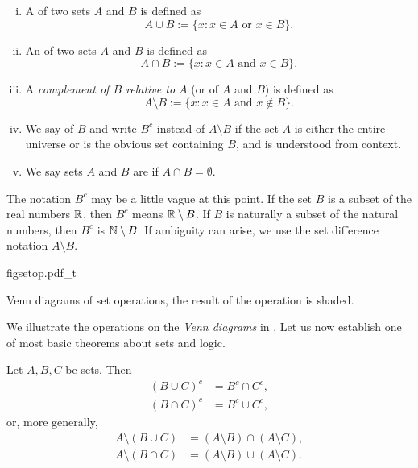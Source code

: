 \begin{defn}
\leavevmode
\begin{enumerate}[(i)]
\item
A \emph{} of two sets $A$ and $B$ is defined as
\begin{equation*}
A \cup B := \{ x : x \in A \text{ or } x \in B \} .
\end{equation*}
\item
An \emph{} of two sets $A$ and $B$ is defined as
\begin{equation*}
A \cap B := \{ x : x \in A \text{ and } x \in B \} .
\end{equation*}
\item
A \emph{complement of $B$ relative to $A$}
(or \emph{} of $A$ and $B$) is defined as
\begin{equation*}
A \setminus B := \{ x : x \in A \text{ and } x \notin B \} .
\end{equation*}
\item
We say
\emph{} of $B$ and write $B^c$ 
instead of $A \setminus B$ if
the set $A$ is either the entire universe or is the obvious
set containing $B$, and is understood from context.
\item
We say sets $A$ and $B$ are \emph{} if $A \cap B =
\emptyset$.
\end{enumerate}
\end{defn}

The notation $B^c$ may be a little vague at this point.  If
the set $B$ is a subset of the real numbers ${\mathbb{R}}$, then $B^c$ means
${\mathbb{R}} \setminus B$.  If $B$ is naturally a subset of the natural numbers,
then $B^c$
is ${\mathbb{N}} \setminus B$.  If ambiguity can arise, we 
use the set difference notation $A \setminus B$.

\begin{myfigureht}
{figsetop.pdf_t}
\caption{Venn diagrams of set operations, the result of the operation is
shaded.\label{figsetop}}
\end{myfigureht}
We illustrate the operations on the
\emph{Venn diagrams} in .
Let us now establish one of most basic theorems about sets and logic.

\begin{thm}[DeMorgan]
Let $A, B, C$ be sets.  Then
\begin{align*}
{(B \cup C)}^c &= B^c \cap C^c , \\
{(B \cap C)}^c &= B^c \cup C^c ,
\end{align*}
or, more generally,
\begin{align*}
A \setminus (B \cup C) &= (A \setminus B) \cap (A \setminus C) , \\
A \setminus (B \cap C) &= (A \setminus B) \cup (A \setminus C) .
\end{align*}
\end{thm}

